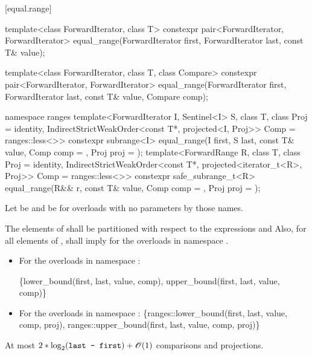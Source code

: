 [equal.range]{}

%
\begin{itemdecl}
template<class ForwardIterator, class T>
  constexpr pair<ForwardIterator, ForwardIterator>
    equal_range(ForwardIterator first,
                ForwardIterator last, const T& value);

template<class ForwardIterator, class T, class Compare>
  constexpr pair<ForwardIterator, ForwardIterator>
    equal_range(ForwardIterator first,
                ForwardIterator last, const T& value,
                Compare comp);

namespace ranges {
  template<ForwardIterator I, Sentinel<I> S, class T, class Proj = identity,
      IndirectStrictWeakOrder<const T*, projected<I, Proj>> Comp = ranges::less<>>
    constexpr subrange<I>
      equal_range(I first, S last, const T& value, Comp comp = {}, Proj proj = {});
  template<ForwardRange R, class T, class Proj = identity,
      IndirectStrictWeakOrder<const T*, projected<iterator_t<R>, Proj>> Comp = ranges::less<>>
    constexpr safe_subrange_t<R>
      equal_range(R&& r, const T& value, Comp comp = {}, Proj proj = {});
}
\end{itemdecl}

\begin{itemdescr}
\pnum
Let  be  and
 be 
for overloads with no parameters by those names.

\pnum
\requires
The elements
of
shall be partitioned with respect to the expressions
and
Also, for all elements
of
\tcode{[first, last)},
 shall imply 
for the overloads in namespace .

\pnum
\returns
\begin{itemize}
\item
For the overloads in namespace :
\begin{codeblock}
\{lower_bound(first, last, value, comp),
 upper_bound(first, last, value, comp)\}
\end{codeblock}
\item
For the overloads in namespace :
\{ranges::lower_bound(first, last, value, comp, proj),
 ranges::upper_bound(first, last, value, comp, proj)\}
\end{itemize}

\pnum
\complexity
At most
$2 * \log_2(\texttt{last - first}) + \mathscr{O}(1)$
comparisons and projections.
\end{itemdescr}

